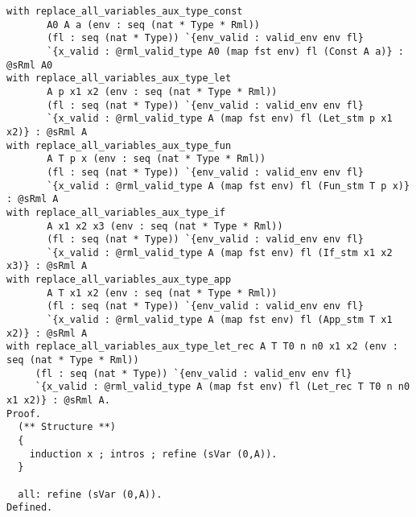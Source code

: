 \documentclass[11pt, leqno, titlepage]{article}
\theoremstyle{definition}
\begin{document}
\begin{appendices}
\begin{lstlisting}[language=coq]
with replace_all_variables_aux_type_const
       A0 A a (env : seq (nat * Type * Rml))
       (fl : seq (nat * Type)) `{env_valid : valid_env env fl}
       `{x_valid : @rml_valid_type A0 (map fst env) fl (Const A a)} : @sRml A0
with replace_all_variables_aux_type_let
       A p x1 x2 (env : seq (nat * Type * Rml))
       (fl : seq (nat * Type)) `{env_valid : valid_env env fl}
       `{x_valid : @rml_valid_type A (map fst env) fl (Let_stm p x1 x2)} : @sRml A
with replace_all_variables_aux_type_fun
       A T p x (env : seq (nat * Type * Rml))
       (fl : seq (nat * Type)) `{env_valid : valid_env env fl}
       `{x_valid : @rml_valid_type A (map fst env) fl (Fun_stm T p x)} : @sRml A
with replace_all_variables_aux_type_if
       A x1 x2 x3 (env : seq (nat * Type * Rml))
       (fl : seq (nat * Type)) `{env_valid : valid_env env fl}
       `{x_valid : @rml_valid_type A (map fst env) fl (If_stm x1 x2 x3)} : @sRml A
with replace_all_variables_aux_type_app
       A T x1 x2 (env : seq (nat * Type * Rml))
       (fl : seq (nat * Type)) `{env_valid : valid_env env fl}
       `{x_valid : @rml_valid_type A (map fst env) fl (App_stm T x1 x2)} : @sRml A
with replace_all_variables_aux_type_let_rec A T T0 n n0 x1 x2 (env : seq (nat * Type * Rml))
     (fl : seq (nat * Type)) `{env_valid : valid_env env fl}
     `{x_valid : @rml_valid_type A (map fst env) fl (Let_rec T T0 n n0 x1 x2)} : @sRml A.
Proof.
  (** Structure **)
  {
    induction x ; intros ; refine (sVar (0,A)).
  }
  
  all: refine (sVar (0,A)).  
Defined.
\end{lstlisting}


\end{appendices}
\end{document}
